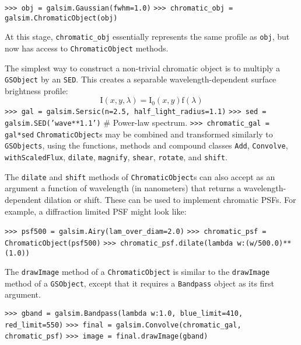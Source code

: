 \documentclass[preprint,11pt]{../../devel/modules/aastex}
\begin{document}
{\tt >>> obj = galsim.Gaussian(fwhm=1.0)}\newline
{\tt >>> chromatic\_obj = galsim.ChromaticObject(obj)}

At this stage, \texttt{chromatic\_obj} essentially represents the same profile as \texttt{obj}, but
now has access to \texttt{ChromaticObject} methods.

The simplest way to construct a non-trivial chromatic object is to multiply a \texttt{GSObject} by
an \texttt{SED}.  This creates a separable wavelength-dependent surface brightness profile:
\begin{equation}
  \mathrm{I}(x, y, \lambda) = \mathrm{I}_0(x, y) \mathrm{f}(\lambda)
\end{equation}
\newline
{\tt >>> gal = galsim.Sersic(n=2.5, half\_light\_radius=1.1)}\newline
{\tt >>> sed = galsim.SED('wave**1.1')} \# Power-law spectrum. \newline
{\tt >>> chromatic\_gal = gal*sed}\newline
\newline
\texttt{ChromaticObject}s may be combined and transformed similarly to
\texttt{GSObjects}, using the functions, methods and compound classes \texttt{Add}, \texttt{Convolve}, \texttt{withScaledFlux}, \texttt{dilate}, \texttt{magnify}, \texttt{shear}, \texttt{rotate}, and \texttt{shift}.

The \texttt{dilate} and \texttt{shift} methods of
\texttt{ChromaticObject}s can also accept as an argument a function of wavelength (in nanometers)
that returns a wavelength-dependent dilation or shift.  These can be used to implement
chromatic PSFs.  For example, a diffraction limited PSF might look
like:

{\tt >>> psf500 = galsim.Airy(lam\_over\_diam=2.0)}\newline
{\tt >>> chromatic\_psf = ChromaticObject(psf500)}\newline
{\tt >>> chromatic\_psf.dilate(lambda w:(w/500.0)**(1.0))}

The \texttt{drawImage} method of a \texttt{ChromaticObject} is similar to the \texttt{drawImage}
method of a \texttt{GSObject},
except that it requires a \texttt{Bandpass} object as its first
argument.

{\tt >>> gband = galsim.Bandpass(lambda w:1.0, blue\_limit=410, red\_limit=550)} \newline
{\tt >>> final = galsim.Convolve(chromatic\_gal, chromatic\_psf)}\newline
{\tt >>> image = final.drawImage(gband)}\newline
\end{document}
